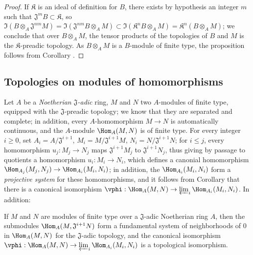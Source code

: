 \begin{proof}
\label{proof-0.7.7.8}
If $\mathfrak{K}$ is an ideal of definition for $B$, there exists by hypothesis an integer $m$ such that $\mathfrak{J}^m B\subset\mathfrak{K}$, so $\Im(B\otimes_A\mathfrak{J}^{nm}M)=\Im(\mathfrak{J}^{nm}B\otimes_A M)\subset\Im(\mathfrak{K}^n B\otimes_A M)=\mathfrak{K}^n(B\otimes_A M)$;
we conclude that over $B\otimes_A M$, the tensor products of the topologies of $B$ and $M$ is the $\mathfrak{K}$-preadic topology.
As $B\otimes_A M$ is a $B$-module of finite type, the proposition follows from Corollary .
\end{proof}

\subsection{Topologies on modules of homomorphisms}
\label{subsection:0.7.8}

\begin{env}[7.8.1]
\label{0.7.8.1}
Let $A$ be a \emph{Noetherian $\mathfrak{J}$-adic} ring, $M$ and $N$ two $A$-modules of finite type,
equipped with the $\mathfrak{J}$-preadic topology; we know  that they are
separated and complete; in addition, every $A$-homomorphism $M\to N$ is automatically continuous, and
the $A$-module $\Hom_A(M,N)$ is of finite type. For every integer $i\geq 0$, set
$A_i=A/\mathfrak{J}^{i+1}$, $M_i=M/\mathfrak{J}^{i+1}M$, $N_i=N/\mathfrak{J}^{i+1}N$; for
$i\leq j$, every homomorphism $u_j:M_j\to N_j$ maps $\mathfrak{J}^{i+1}M_j$ to
$\mathfrak{J}^{i+1}N_j$, thus giving by passage to quotients a homomorphism $u_i:M_i\to N_i$, which
defines a canonial homomorphism $\Hom_{A_j}(M_j,N_j)\to\Hom_{A_i}(M_i,N_i)$; in addition, the
$\Hom_{A_i}(M_i,N_i)$ form a \emph{projective system} for these homomorphisms, and it follows from
Corollary  that there is a canonical isomorphism
$\vphi:\Hom_A(M,N)\to\varprojlim_i\Hom_{A_i}(M_i,N_i)$.
In addition:
\end{env}

\begin{proposition}[7.8.2]
\label{0.7.8.2}
If $M$ and $N$ are modules of finite type over a $\mathfrak{J}$-adic Noetherian ring $A$, then the
submodules $\Hom_A(M,\mathfrak{J}^{i+1}N)$ form a fundamental system of neighborhoods of $0$ in
$\Hom_A(M,N)$ for the $\mathfrak{J}$-adic topology, and the canonical isomorphism
$\vphi:\Hom_A(M,N)\to\varprojlim_i\Hom_{A_i}(M_i,N_i)$ is a topological isomorphism.
\end{proposition}

